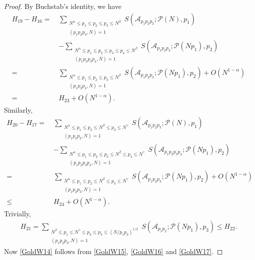 \documentclass[10pt,a4paper]{amsart}
\def\le{\leqslant}
\def\leq{\leqslant}
\begin{document}
\begin{proof}
By Buchstab's identity, we have
\begin{equation}\label{GoldW15}
\begin{split}
H_{19}-H_{16}
=\ &\sum_{\substack{N^\alpha \le p_1 \le p_2 \le p_3\le N^\beta \\ (p_1 p_2 p_3, N) = 1}}  S(\mathscr{A}_{p_1 p_2 p_3}; \mathscr{P}(N), p_1)\\&-\sum_{\substack{N^\alpha \le p_1 \le p_2 \le p_3\le p_4\le N^\beta \\ (p_1 p_2 p_3 p_4, N) = 1}}  S(\mathscr{A}_{p_1 p_2 p_3}; \mathscr{P}(Np_1), p_2)\\
=\ &\sum_{\substack{N^\alpha \le p_1 \le p_2 \le p_3\le N^\beta \\ (p_1 p_2 p_3, N) = 1}}  S(\mathscr{A}_{p_1 p_2 p_3}; \mathscr{P}(Np_1), p_2)+O(N^{1-\alpha})\\
=\ &H_{23}+O(N^{1-\alpha}). 
\end{split}
\end{equation}
Similarly, 
\begin{equation}\label{GoldW16}
\begin{split}
H_{20}-H_{17}
=\ &\sum_{\substack{N^{\alpha} \leq p_1 \le p_2 \le N^{\beta} \leq p_3 \le N^{\gamma}\\ (p_1 p_2 p_3, N) = 1}} S(\mathscr{A}_{p_1 p_2 p_3}; \mathscr{P}(N), p_1)\\&-\sum_{\substack{N^{\alpha} \leq p_1 \le p_2 \le p_3 \le N^{\beta} \leq p_4 \le N^{\gamma} \\ (p_1 p_2 p_3 p_4, N) = 1}} S(\mathscr{A}_{p_1 p_2 p_3 p_4}; \mathscr{P}(Np_1), p_2)\\
=\ &\sum_{\substack{N^{\alpha} \leq p_1 \le p_2 \le N^{\beta} \leq p_3 \le N^{\gamma}\\ (p_1 p_2 p_3, N) = 1}} S(\mathscr{A}_{p_1 p_2 p_3}; \mathscr{P}(Np_1), p_2)+O(N^{1-\alpha})\\
\le \ &H_{24}+O(N^{1-\alpha}). 
\end{split}
\end{equation}
Trivially, 
\begin{equation}\label{GoldW17}
\begin{split}
H_{21}=\sum_{\substack{N^{\beta} \leq p_1 \le N^{\gamma} \leq p_2 \le p_3\le (N/p_1p_2)^{1/2} \\ (p_1 p_2 p_3, N) = 1}} S(\mathscr{A}_{p_1 p_2}; \mathscr{P}(N p_1), p_3)\le H_{22}. 
\end{split}
\end{equation}
Now \eqref{GoldW14} follows from \eqref{GoldW15}, \eqref{GoldW16} and \eqref{GoldW17}.
\end{proof}
\end{document}
